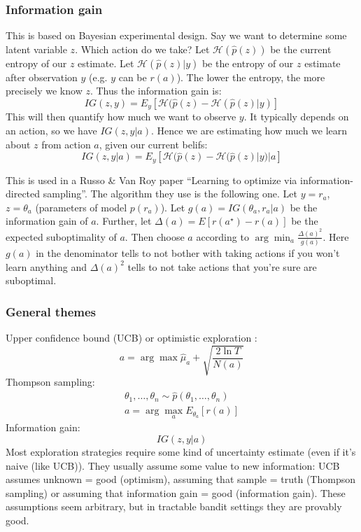 \documentclass{report}
\newcommand{\argmin}{\arg\!\min}
\newcommand{\argmax}{\arg\!\max}
\begin{document}
\subsubsection{Information gain}
This is based on Bayesian experimental design.
Say we want to determine some latent variable $z$. Which action do we take?
Let $\mathcal{H}(\hat{p}(z))$ be the current entropy of our $z$ estimate.
Let $ \mathcal{H}(\hat{p}(z)|y)  $ be the entropy of our $z$ estimate after observation $y$ (e.g. $y$ can be $r(a)$).
The lower the entropy, the more precisely we know $z$.
Thus the information gain is:
\begin{equation}
		IG(z, y) = E_y \left[ \mathcal{H}(\hat{p}(z) - \mathcal{H}(\hat{p}(z)|y) \right] 
\end{equation}
This will then quantify how much we want to observe $y$.
It typically depends on an action, so we have $IG(z,y|a)$.
Hence we are estimating how much we learn about $z$ from action $a$, given our current belifs:
\begin{equation}
		IG(z, y|a) = E_y \left[ \mathcal{H}(\hat{p}(z) - \mathcal{H}(\hat{p}(z)|y)|a \right] 
\end{equation}

This is used in a Russo \& Van Roy paper ``Learning to optimize via information-directed sampling''.
The algorithm they use is the following one. Let $y=r_a$, $ z = \theta_a  $ (parameters of model $p(r_a)$).
Let $g(a) = IG(\theta_a, r_a|a)$  be the information gain of $a$. Further, let
$\Delta(a) = E \left[ r(a^\star) - r(a) \right] $ be the expected suboptimality of $a$.
Then choose $a$ according to $ \argmin_a \frac{\Delta (a)^2}{g(a)}   $.
Here $g(a)$ in the denominator tells to not bother with taking actions if you won't learn anything
and $\Delta (a)^2$ tells to not take actions that you're sure are suboptimal.

\subsubsection{General themes}
Upper confidence bound (UCB) or optimistic exploration :
\begin{equation}
		a = \argmax \hat{\mu}_a + \sqrt{ \frac{2\ln T}{N(a)}  }
\end{equation}
Thompson sampling:
\begin{gather}
		\theta_1, \dots, \theta_n \sim \hat{p} 	(\theta_1, \dots, \theta_n) \\
		a = \argmax_a E_{\theta_a} \left[ r(a) \right] 
\end{gather}
Information gain:
\begin{equation}
		IG(z,y|a)
\end{equation}
Most exploration strategies require some kind of uncertainty estimate (even if it's naive (like UCB)).
They usually assume some value to new information:
UCB assumes unknown = good (optimism), assuming that sample = truth (Thompson sampling) or
assuming that information gain = good (information gain).
These assumptions seem arbitrary, but in tractable bandit settings they are provably good.
\end{document}
